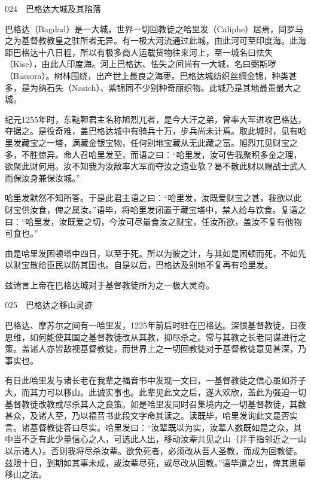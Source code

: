 \documentclass[12pt,UTF8]{ctexbook}
\begin{document}
024　巴格达大城及其陷落

巴格达（Bagdad）是一大城，世界一切回教徒之哈里发（Caliphe）居焉，同罗马之为基督教教皇之驻所者无异。有一极大河流通过此城，由此河可至印度海。此海距巴格达十八日程，所以有极多商人运载货物往来河上，至一城名曰怯失（Kise），由此人印度海。河上巴格达、怯失之间尚有一大城，名曰弼斯哕（Bassora）。树林围绕，出产世上最良之海枣。巴格达城纺织丝绸金锦，种类甚多，是为纳石失（Nasich）、紫锦同不少别种奇丽织物。此城乃是其地最贵最大之城。

纪元1255年时，东鞑靼君主名称旭烈兀者，是今大汗之弟，曾率大军进攻巴格达，夺据之。是役奇难，盖巴格达城中有骑兵十万，步兵尚未计焉。取此城时，见有哈里发藏宝之一塔，满藏金银宝物，任何别地宝藏从无此藏之富。旭烈兀见财宝之多，不胜惊异。命人召哈里发至，而语之曰：“哈里发，汝可告我聚积多金之理，欲聚此财何用。汝不知我为汝敌率大军而夺汝之遗业欤？曷不散此财以赐战士武人而保汝身兼保汝城。”

哈里发默然不知所答。于是此君主语之曰：“哈里发，汝既爱财宝之甚，我欲以此财宝供汝食，俾之属汝。”语毕，将哈里发闭置于藏宝塔中，禁人给与饮食。复语之曰：“哈里发，汝既爱之切，今汝可尽量食汝之财宝，任汝所欲，盖汝不复有他物可食也。”

由是哈里发困顿塔中四日，以至于死。所以为彼之计，与其如是困顿而死，不如先以财宝散给臣民以防其国也。自是以后，巴格达及别地不复再有哈里发。

兹请言上帝在巴格达城对于基督教徒所为之一极大灵奇。





025　巴格达之移山灵迹

巴格达、摩苏尔之间有一哈里发，1225年前后时驻在巴格达。深恨基督教徒，日夜思维，如何能使其国之基督教徒改从其教，抑尽杀之。常与其教之长老同谋进行之策。盖诸人亦皆敌视基督教徒，而世界上之一切回教徒对于基督教徒意见甚深，乃事实也。

有日此哈里发与诸长老在我辈之福音书中发现一文曰，一基督教徒之信心虽如芥子大，而其力可以移山。此诚实事也。此辈见此文之后，遂大欢欣，盖此为强迫一切基督教徒改教或尽杀其人之良策。如是哈里发同时召集境内之一切基督教徒，其数甚众，及诸人至，乃以福音书此段文字命其读之。读既毕，哈里发询此文是否实言。诸基督教徒答曰尽实。哈里发曰：“汝辈既以为实，汝辈人数既如是之众，其中当不乏有此少量信心之人，可选此人出，移动汝辈共见之山（并手指邻近之一山以示诸人）。否则我将尽杀汝辈。欲免死者，必须改从吾人圣教，而成为回教徒。兹限十日，到期如其事未成，或汝辈尽死，或尽改从回教。”语毕遣之出，俾其思量移山之法。
\end{document}
